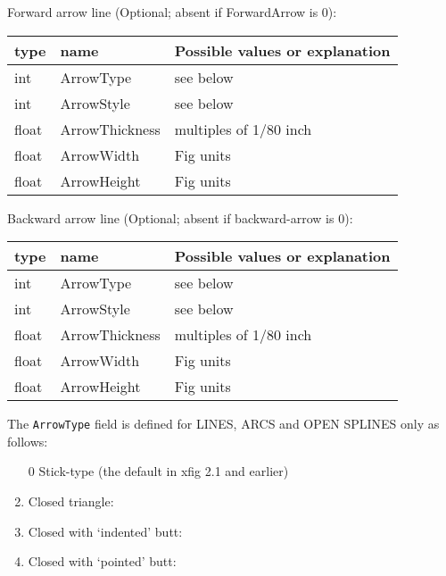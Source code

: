 \documentclass[10pt, a4paper]{article}
\begin{document}
Forward arrow line (Optional; absent if ForwardArrow is 0): \\
%
\begin{tabular}{lll}
\toprule
type & name & Possible values or explanation \\
\midrule
\midrule
int    & ArrowType      & see below \\
int    & ArrowStyle     & see below \\
float  & ArrowThickness & multiples of 1/80 inch \\
float  & ArrowWidth     & Fig units \\
float  & ArrowHeight    & Fig units \\
\bottomrule
\end{tabular}

Backward arrow line (Optional; absent if backward-arrow is 0): \\
%
\begin{tabular}{lll}
\toprule
type & name & Possible values or explanation \\
\midrule
\midrule
int    & ArrowType      & see below \\
int    & ArrowStyle     & see below \\
float  & ArrowThickness & multiples of 1/80 inch \\
float  & ArrowWidth     & Fig units \\
float  & ArrowHeight    & Fig units \\
\bottomrule
\end{tabular}

The \texttt{ArrowType} field is defined for LINES, ARCS and OPEN SPLINES only as follows:
%
\begin{enumerate}
\item[0] Stick-type (the default in xfig 2.1 and earlier)
\item    Closed triangle:
 \item   Closed with `indented' butt:
\item    Closed with `pointed' butt:
\end{enumerate}
\end{document}
